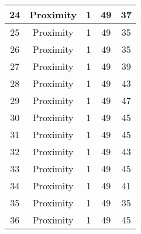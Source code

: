 \documentclass[results.tex]{subfiles}
\begin{document}
\begin{center}
\begin{tabular}{| c || c | c | c | c |}
            \hline
            24                      & Proximity                    & 1                      & 49                      & 37                   \\
            \hline
            25                      & Proximity                    & 1                      & 49                      & 35                   \\
            \hline
            26                      & Proximity                    & 1                      & 49                      & 35                   \\
            \hline
            27                      & Proximity                    & 1                      & 49                      & 39                   \\
            \hline
            28                      & Proximity                    & 1                      & 49                      & 43                   \\
            \hline
            29                      & Proximity                    & 1                      & 49                      & 47                   \\
            \hline
            30                      & Proximity                    & 1                      & 49                      & 45                   \\
            \hline
            31                      & Proximity                    & 1                      & 49                      & 45                   \\
            \hline
            32                      & Proximity                    & 1                      & 49                      & 43                   \\
            \hline
            33                      & Proximity                    & 1                      & 49                      & 45                   \\
            \hline
            34                      & Proximity                    & 1                      & 49                      & 41                   \\
            \hline
            35                      & Proximity                    & 1                      & 49                      & 35                   \\
            \hline
            36                      & Proximity                    & 1                      & 49                      & 45                   \\

\end{tabular}
\end{center}
\end{document}
